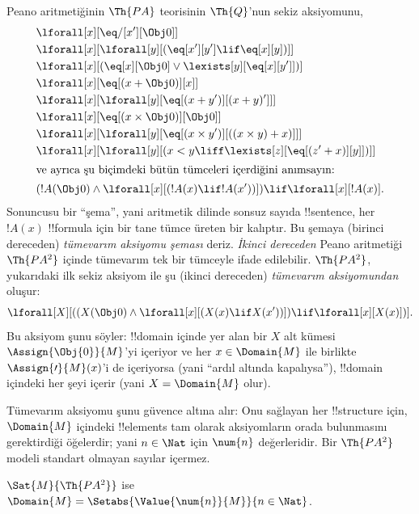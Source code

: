 \documentclass[../../../include/open-logic-section]{subfiles}
\begin{document}


Peano aritmetiğinin $\Th{PA}$ teorisinin $\Th{Q}$'nun sekiz aksiyomunu,
\begin{align*}
& \lforall[x][\eq/[x'][\Obj 0]]\\
& \lforall[x][\lforall[y][(\eq[x'][y'] \lif \eq[x][y])]]\\
& \lforall[x][(\eq[x][\Obj 0] \lor \lexists[y][\eq[x][y']])]\\ 
& \lforall[x][\eq[(x + \Obj 0)][x]]\\
& \lforall[x][\lforall[y][\eq[(x + y')][(x + y)']]]\\
& \lforall[x][\eq[(x \times \Obj 0)][\Obj 0]]\\
& \lforall[x][\lforall[y][\eq[(x \times y')][((x \times y) + x)]]]\\
& \lforall[x][\lforall[y][(x < y \liff \lexists[z][\eq[(z' + x)][y]])]]\\
\intertext{ve ayrıca şu biçimdeki bütün tümceleri içerdiğini anımsayın:}
& (!A(\Obj 0) \land \lforall[x][(!A(x) \lif !A(x'))]) \lif \lforall[x][!A(x)].
\end{align*}
Sonuncusu bir ``şema'', yani aritmetik dilinde sonsuz sayıda !!{sentence},
her $!A(x)$ !!{formula} için bir tane tümce üreten bir kalıptır. Bu
şemaya (birinci dereceden) \emph{tümevarım aksiyomu şeması} deriz.
\emph{İkinci dereceden} Peano aritmetiği $\Th{PA^2}$ içinde tümevarım tek bir
tümceyle ifade edilebilir. $\Th{PA^2}$, yukarıdaki ilk sekiz aksiyom ile şu
(ikinci dereceden) \emph{tümevarım aksiyomundan} oluşur:
\[
\lforall[X][((X(\Obj 0) \land \lforall[x][(X(x) \lif X(x'))]) \lif \lforall[x][X(x)])].
\]
Bu aksiyom şunu söyler: !!{domain} içinde yer alan bir $X$ alt kümesi
$\Assign{\Obj{0}}{M}$'yi içeriyor ve her $x\in\Domain{M}$ ile birlikte
$\Assign{\prime}{M}(x)$'i de içeriyorsa (yani ``ardıl altında kapalıysa''),
!!{domain} içindeki her şeyi içerir (yani $X=\Domain{M}$ olur).

Tümevarım aksiyomu şunu güvence altına alır: Onu sağlayan her !!{structure}
için, $\Domain{M}$ içindeki !!{element}s tam olarak aksiyomların orada
bulunmasını gerektirdiği öğelerdir; yani $n\in\Nat$ için $\num{n}$
değerleridir. Bir $\Th{PA^2}$ modeli standart olmayan sayılar içermez.

\begin{thm}
$\Sat{M}{\Th{PA^2}}$ ise $\Domain{M} =
\Setabs{\Value{\num{n}}{M}}{n \in \Nat}$.
\end{thm}
\end{document}
